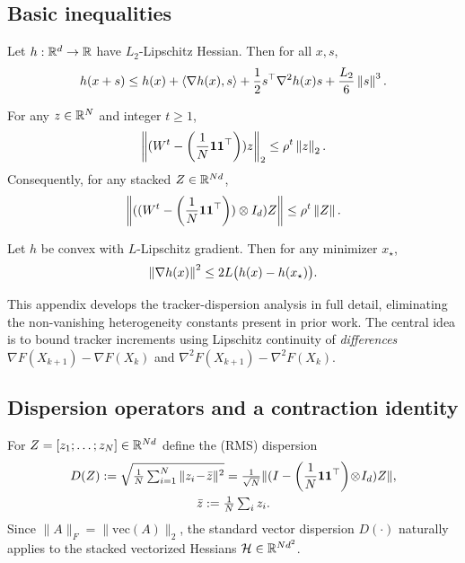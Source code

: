 \documentclass[review,onefignum,onetabnum]{siamart171218}
\begin{document}
\subsection{Basic inequalities}\label{ssec:basic}
\begin{lemma}\label{lem:taylor3}
Let $h:\mathbb{R}^d\to\mathbb{R}$ have $L_2$-Lipschitz Hessian. Then for all $x,s$,
\[
h(x+s)\le h(x)+\left\langle \nabla h(x),s\right\rangle+\frac12 s^\top\nabla^2 h(x)s+\frac{L_2}{6}\left\|s\right\|^3.
\]
\end{lemma}

\begin{lemma}\label{lem:consensus}
For any $z\in\mathbb{R}^N$ and integer $t\ge 1$,
\[
\left\|(W^t-\left(\frac{1}{N}\mathbf{1}\mathbf{1}^\top\right))z\right\|_2\le \rho^t\left\|z\right\|_2.
\]
Consequently, for any stacked $Z\in\mathbb{R}^{Nd}$,
\[
\left\|((W^t-\left(\frac{1}{N}\mathbf{1}\mathbf{1}^\top\right))\otimes I_d)Z\right\|\le \rho^t\left\|Z\right\|.
\]
\end{lemma}

\begin{lemma}\label{lem:gap-grad}
Let $h$ be convex with $L$-Lipschitz gradient. Then for any minimizer $x_\star$,
\[
\left\|\nabla h(x)\right\|^2\le 2L\big(h(x)-h(x_\star)\big).
\]
\end{lemma}

This appendix develops the tracker-dispersion analysis in full detail,
eliminating the non-vanishing heterogeneity constants present in prior
work.
The central idea is to bound tracker increments using Lipschitz
continuity of \emph{differences}
$\nabla F(X_{k+1})-\nabla F(X_k)$ and
$\nabla^2F(X_{k+1})-\nabla^2F(X_k)$.

\subsection{Dispersion operators and a contraction identity}

For $Z=[z_1;\dots;z_N]\in\mathbb{R}^{Nd}$ define the (RMS) dispersion
\begin{gather*}
D(Z):=\sqrt{\tfrac1N\textstyle\sum_{i=1}^N\|z_i\!-\!\bar z\|^2}
=\tfrac{1}{\sqrt N}\|(I-\left(\frac{1}{N}\mathbf{1}\mathbf{1}^\top\right)\!\otimes\! I_d)Z\|,\\
\bar z:=\tfrac1N\textstyle\sum_i z_i.
\end{gather*}
Since $\|A\|_F = \|\mathrm{vec}(A)\|_2$, the standard vector dispersion $D(\cdot)$ naturally applies to the stacked vectorized Hessians $\mathcal{H} \in \mathbb{R}^{Nd^2}$.
\end{document}
